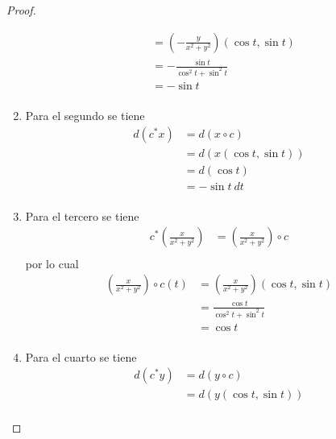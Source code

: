 \documentclass[12pt]{report}
\theoremstyle{largebreak}
\begin{document}
\begin{proof}
\begin{enumerate}
\begin{equation*}
\begin{split}
                    &=\left(-\frac{y}{x^2+y^2}\right)(\cos t, \sin t)\\
                    &=-\frac{\sin t}{\cos^2t+\sin^2t}\\
                    &=-\sin t\\
                \end{split}
            \end{equation*}
            \item Para el segundo se tiene
            \begin{equation*}
                \begin{split}
                    d\left(c^*x\right)&=d\left(x\circ c\right)\\
                    &=d\left(x(\cos t,\sin t)\right)\\
                    &=d\left(\cos t\right)\\
                    &=-\sin t\:dt\\
                \end{split}
            \end{equation*}
            \item Para el tercero se tiene
            \begin{equation*}
                \begin{split}
                    c^*\left(\frac{x}{x^2+y^2}\right)&=\left(\frac{x}{x^2+y^2}\right)\circ c \\
                \end{split}
            \end{equation*}
            por lo cual
            \begin{equation*}
                \begin{split}
                    \left(\frac{x}{x^2+y^2}\right)\circ c(t)&=\left(\frac{x}{x^2+y^2}\right)(\cos t,\sin t)\\
                    &=\frac{\cos t}{\cos^2t+\sin^2t}\\
                    &=\cos t\\
                \end{split}
            \end{equation*}
            \item Para el cuarto se tiene
            \begin{equation*}
                \begin{split}
                    d\left(c^*y\right)&=d\left(y\circ c\right)\\
                    &=d\left(y(\cos t, \sin t)\right)\\

\end{split}
\end{equation*}
\end{enumerate}
\end{proof}
\end{document}
